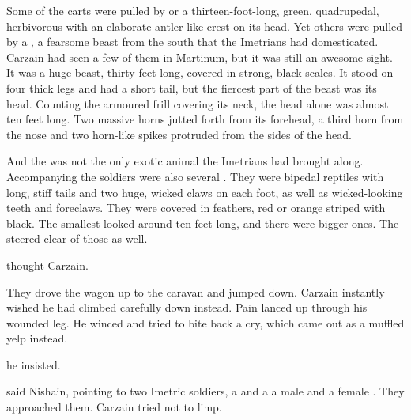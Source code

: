 Some of the carts were pulled by  or \dash a thirteen-foot-long, green, quadrupedal, herbivorous \saurian{} with an elaborate antler-like crest on its head. 
Yet others were pulled by a , a fearsome beast from the south that the Imetrians had domesticated. Carzain had seen a few of them in Martinum, but it was still an awesome sight. 
It was a huge beast, thirty feet long, covered in strong, black scales. It stood on four thick legs and had a short tail, but the fiercest part of the beast was its head. Counting the armoured frill covering its neck, the head alone was almost ten feet long. Two massive horns jutted forth from its forehead, a third horn from the nose and two horn-like spikes protruded from the sides of the head. 

And the \mulgron{} was not the only exotic animal the Imetrians had brought along. 
Accompanying the soldiers were also several . 
They were bipedal reptiles with long, stiff tails and two huge, wicked claws on each foot, as well as wicked-looking teeth and foreclaws. 
They were covered in feathers, red or orange striped with black. 
The smallest looked around ten feet long, and there were bigger ones. 
The \Bryndwiners{} steered clear of those as well. 

 thought Carzain. 

They drove the wagon up to the caravan and jumped down. 
Carzain instantly wished he had climbed carefully down instead. 
Pain lanced up through his wounded leg. 
He winced and tried to bite back a cry, which came out as a muffled yelp instead. 

 he insisted. 

 said Nishain, pointing to two Imetric soldiers, a  and a \dash a male and a female \scatha. 
They approached them. 
Carzain tried not to limp. 

